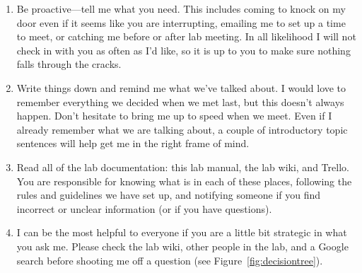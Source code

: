 \documentclass[letterpaper,12pt,oneside]{memoir}
\begin{document}
\begin{enumerate}
\item Be proactive---tell me what you need. This includes coming to knock on my door even if it seems like you are interrupting, emailing me to set up a time to meet, or catching me before or after lab meeting. In all likelihood I will not check in with you as often as I'd like, so it is up to you to make sure nothing falls through the cracks.

\item Write things down and remind me what we've talked about. I would love to remember everything we decided when we met last, but this doesn't always happen. Don't hesitate to bring me up to speed when we meet. Even if I already remember what we are talking about, a couple of introductory topic sentences will help get me in the right frame of mind.

\item Read all of the lab documentation: this lab manual, the lab wiki, and Trello. You are responsible for knowing what is in each of these places, following the rules and guidelines we have set up, and notifying someone if you find incorrect or unclear information (or if you have questions).

\item I can be the most helpful to everyone if you are a little bit strategic in what you ask me. Please check the lab wiki, other people in the lab, and a Google search before shooting me off a question (see Figure~\ref{fig:decisiontree}).

\end{enumerate}
\end{document}
